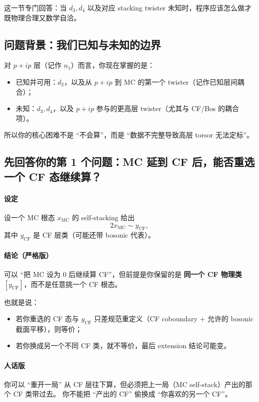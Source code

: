 \documentclass[a4paper,fontset=ubuntu,12pt]{ctexart}
\begin{document}
这一节专门回答：当 $d_3,d_4$ 以及对应 stacking twister 未知时，程序应该怎么做才既物理合理又数学自洽。

\subsection{问题背景：我们已知与未知的边界}

对 $p+ip$ 层（记作 $n_1$）而言，你现在掌握的是：
\begin{itemize}
\item 已知并可用：$d_2$，以及从 $p+ip$ 到 MC 的第一个 twister（记作已知层间耦合）；
\item 未知：$d_3,d_4$，以及 $p+ip$ 参与的更高层 twister（尤其与 CF/Bos 的耦合项）。
\end{itemize}

所以你的核心困难不是 ``不会算''，而是 ``数据不完整导致高层 torsor 无法定标''。

\subsection{先回答你的第 1 个问题：MC 延到 CF 后，能否重选一个 CF 态继续算？}

\paragraph{设定}
设一个 MC 根态 $x_{\mathrm{MC}}$ 的 self-stacking 给出
\begin{equation}
2x_{\mathrm{MC}}\sim y_{\mathrm{CF}},
\label{eq:mc-to-cf-y}
\end{equation}
其中 $y_{\mathrm{CF}}$ 是 CF 层类（可能还带 bosonic 代表）。

\paragraph{结论（严格版）}
可以 ``把 MC 设为 0 后继续算 CF''，但前提是你保留的是 \textbf{同一个 CF 物理类} $[y_{\mathrm{CF}}]$，而不是任意挑一个 CF 根态。

也就是说：
\begin{itemize}
\item 若你重选的 CF 态与 $y_{\mathrm{CF}}$ 只差规范重定义（CF coboundary + 允许的 bosonic 截面平移），则等价；
\item 若你换成另一个不同 CF 类，就不等价，最后 extension 结论可能变。
\end{itemize}

\paragraph{人话版}
你可以 ``重开一局'' 从 CF 层往下算，但必须把上一局（MC self-stack）产出的那个 CF 类带过去。  
你不能把 ``产出的 CF'' 偷换成 ``你喜欢的另一个 CF''。
\end{document}
